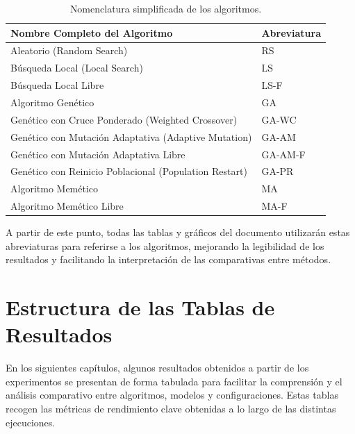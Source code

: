 \begin{table}[htp]
    \centering
    \begin{tabular}{ll}
        \toprule
        \textbf{Nombre Completo del Algoritmo}                 & \textbf{Abreviatura} \\
        \midrule
        Aleatorio (Random Search)                              & RS                   \\
        Búsqueda Local (Local Search)                          & LS                   \\
        Búsqueda Local Libre                                   & LS-F                 \\
        Algoritmo Genético                                     & GA                   \\
        Genético con Cruce Ponderado (Weighted Crossover)      & GA-WC                \\
        Genético con Mutación Adaptativa (Adaptive Mutation)   & GA-AM                \\
        Genético con Mutación Adaptativa Libre                 & GA-AM-F              \\
        Genético con Reinicio Poblacional (Population Restart) & GA-PR                \\
        Algoritmo Memético                                     & MA                   \\
        Algoritmo Memético Libre                               & MA-F                 \\
        \bottomrule
    \end{tabular}
    \caption{Nomenclatura simplificada de los algoritmos.}
    \label{tab:nombres-algoritmos}
\end{table}

A partir de este punto, todas las tablas y gráficos del documento utilizarán estas abreviaturas para referirse a los algoritmos,
mejorando la legibilidad de los resultados y facilitando la interpretación de las comparativas entre métodos.


\section{Estructura de las Tablas de Resultados}\label{subsec:estructura-tablas}
En los siguientes capítulos, algunos resultados obtenidos a partir de los experimentos se presentan de forma tabulada para facilitar la
comprensión y el análisis comparativo entre algoritmos, modelos y configuraciones.
Estas tablas recogen las métricas de rendimiento clave obtenidas a lo largo de las distintas ejecuciones.

